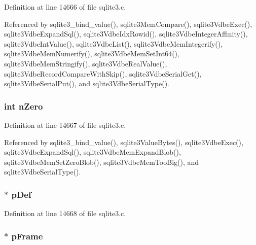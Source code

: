 Definition at line 14666 of file sqlite3.\+c.



Referenced by sqlite3\+\_\+bind\+\_\+value(), sqlite3\+Mem\+Compare(), sqlite3\+Vdbe\+Exec(), sqlite3\+Vdbe\+Expand\+Sql(), sqlite3\+Vdbe\+Idx\+Rowid(), sqlite3\+Vdbe\+Integer\+Affinity(), sqlite3\+Vdbe\+Int\+Value(), sqlite3\+Vdbe\+List(), sqlite3\+Vdbe\+Mem\+Integerify(), sqlite3\+Vdbe\+Mem\+Numerify(), sqlite3\+Vdbe\+Mem\+Set\+Int64(), sqlite3\+Vdbe\+Mem\+Stringify(), sqlite3\+Vdbe\+Real\+Value(), sqlite3\+Vdbe\+Record\+Compare\+With\+Skip(), sqlite3\+Vdbe\+Serial\+Get(), sqlite3\+Vdbe\+Serial\+Put(), and sqlite3\+Vdbe\+Serial\+Type().

\hypertarget{union_mem_1_1_mem_value_aac4adea394a18cc831013e53685e05eb}{}
\subsubsection[{n\+Zero}]{\setlength{\rightskip}{0pt plus 5cm}int n\+Zero}\label{union_mem_1_1_mem_value_aac4adea394a18cc831013e53685e05eb}


Definition at line 14667 of file sqlite3.\+c.



Referenced by sqlite3\+\_\+bind\+\_\+value(), sqlite3\+Value\+Bytes(), sqlite3\+Vdbe\+Exec(), sqlite3\+Vdbe\+Expand\+Sql(), sqlite3\+Vdbe\+Mem\+Expand\+Blob(), sqlite3\+Vdbe\+Mem\+Set\+Zero\+Blob(), sqlite3\+Vdbe\+Mem\+Too\+Big(), and sqlite3\+Vdbe\+Serial\+Type().

\hypertarget{union_mem_1_1_mem_value_a09b4cd9b3fcd86a6d7d9ec00b185ec25}{}
\subsubsection[{p\+Def}]{$\ast$ p\+Def}\label{union_mem_1_1_mem_value_a09b4cd9b3fcd86a6d7d9ec00b185ec25}


Definition at line 14668 of file sqlite3.\+c.

\hypertarget{union_mem_1_1_mem_value_ad71093eb5e589645373a69f115714ec7}{}
\subsubsection[{p\+Frame}]{$\ast$ p\+Frame}\label{union_mem_1_1_mem_value_ad71093eb5e589645373a69f115714ec7}



